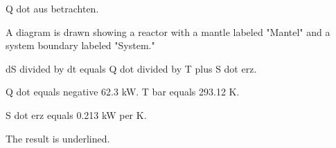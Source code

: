 Q dot aus betrachten.  

A diagram is drawn showing a reactor with a mantle labeled "Mantel" and a system boundary labeled "System."  

dS divided by dt equals Q dot divided by T plus S dot erz.  

Q dot equals negative 62.3 kW.  
T bar equals 293.12 K.  

S dot erz equals 0.213 kW per K.  

The result is underlined.